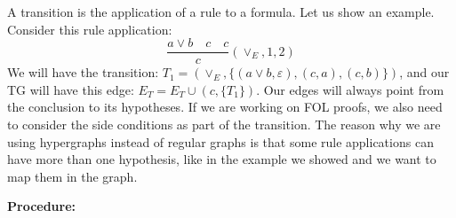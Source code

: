 \documentclass[runningheads]{llncs}
\begin{document}
A transition is the application of a rule to a formula. Let us show an example. Consider this rule application:
\[
\frac{{a \vee b} \quad {{c}} \quad {{c}}}{c} {\scriptstyle(\vee_E,1,2)}
\]
We will have the transition: \(T_1 = (\vee_E, \{(a \vee b, \varepsilon), (c, a), (c, b)\})\), and our TG will have this edge: \(E_T = E_T \cup (c, \{T_1\})\). Our edges will always point from the conclusion to its hypotheses. If we are working on FOL proofs, we also need to consider the side conditions as part of the transition. The reason why we are using hypergraphs instead of regular graphs is that some rule applications can have more than one hypothesis, like in the example we showed and we want to map them in the graph.

\vspace{1em}
\textbf{Procedure: }
\end{document}
